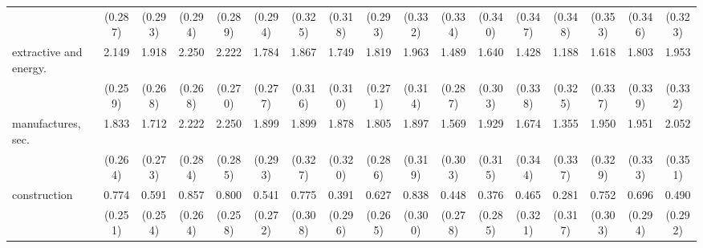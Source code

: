 {\begin{tabular}{l*{16}{c}}
                    &     (0.287)         &     (0.293)         &     (0.294)         &     (0.289)         &     (0.294)         &     (0.325)         &     (0.318)         &     (0.293)         &     (0.332)         &     (0.334)         &     (0.340)         &     (0.347)         &     (0.348)         &     (0.353)         &     (0.346)         &     (0.323)         \\
[1em]
extractive and energy.&       2.149\sym{***}&       1.918\sym{***}&       2.250\sym{***}&       2.222\sym{***}&       1.784\sym{***}&       1.867\sym{***}&       1.749\sym{***}&       1.819\sym{***}&       1.963\sym{***}&       1.489\sym{***}&       1.640\sym{***}&       1.428\sym{***}&       1.188\sym{***}&       1.618\sym{***}&       1.803\sym{***}&       1.953\sym{***}\\
                    &     (0.259)         &     (0.268)         &     (0.268)         &     (0.270)         &     (0.277)         &     (0.316)         &     (0.310)         &     (0.271)         &     (0.314)         &     (0.287)         &     (0.303)         &     (0.338)         &     (0.325)         &     (0.337)         &     (0.339)         &     (0.332)         \\
[1em]
manufactures, sec.  &       1.833\sym{***}&       1.712\sym{***}&       2.222\sym{***}&       2.250\sym{***}&       1.899\sym{***}&       1.899\sym{***}&       1.878\sym{***}&       1.805\sym{***}&       1.897\sym{***}&       1.569\sym{***}&       1.929\sym{***}&       1.674\sym{***}&       1.355\sym{***}&       1.950\sym{***}&       1.951\sym{***}&       2.052\sym{***}\\
                    &     (0.264)         &     (0.273)         &     (0.284)         &     (0.285)         &     (0.293)         &     (0.327)         &     (0.320)         &     (0.286)         &     (0.319)         &     (0.303)         &     (0.315)         &     (0.344)         &     (0.337)         &     (0.329)         &     (0.333)         &     (0.351)         \\
[1em]
construction        &       0.774\sym{**} &       0.591\sym{*}  &       0.857\sym{**} &       0.800\sym{**} &       0.541\sym{*}  &       0.775\sym{*}  &       0.391         &       0.627\sym{*}  &       0.838\sym{**} &       0.448         &       0.376         &       0.465         &       0.281         &       0.752\sym{*}  &       0.696\sym{*}  &       0.490         \\
                    &     (0.251)         &     (0.254)         &     (0.264)         &     (0.258)         &     (0.272)         &     (0.308)         &     (0.296)         &     (0.265)         &     (0.300)         &     (0.278)         &     (0.285)         &     (0.321)         &     (0.317)         &     (0.303)         &     (0.294)         &     (0.292)         \\

\end{tabular}}
